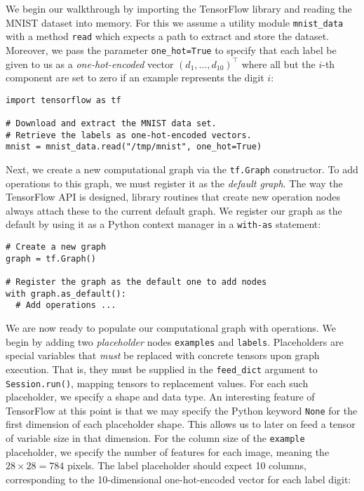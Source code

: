 We begin our walkthrough by importing the TensorFlow library and reading the
MNIST dataset into memory. For this we assume a utility module
\texttt{mnist\_data} with a method \texttt{read} which expects a path to extract
and store the dataset. Moreover, we pass the parameter \texttt{one\_hot=True} to
specify that each label be given to us as a \emph{one-hot-encoded} vector
$(d_1, \dots, d_{10})^\top$ where all but the $i$-th component are set to zero
if an example represents the digit $i$:

\begin{lstlisting}
import tensorflow as tf

# Download and extract the MNIST data set.
# Retrieve the labels as one-hot-encoded vectors.
mnist = mnist_data.read("/tmp/mnist", one_hot=True)
\end{lstlisting}

Next, we create a new computational graph via the \texttt{tf.Graph}
constructor. To add operations to this graph, we must register it as the
\emph{default graph}. The way the TensorFlow API is designed, library routines
that create new operation nodes always attach these to the current default
graph. We register our graph as the default by using it as a Python context
manager in a \texttt{with-as} statement:

\begin{lstlisting}
# Create a new graph
graph = tf.Graph()

# Register the graph as the default one to add nodes
with graph.as_default():
  # Add operations ...
\end{lstlisting}

We are now ready to populate our computational graph with operations. We begin
by adding two \emph{placeholder} nodes \texttt{examples} and
\texttt{labels}. Placeholders are special variables that \emph{must} be replaced
with concrete tensors upon graph execution. That is, they must be supplied in
the \texttt{feed\_dict} argument to \texttt{Session.run()}, mapping tensors to
replacement values. For each such placeholder, we specify a shape and
data type. An interesting feature of TensorFlow at this point is that we may
specify the Python keyword \texttt{None} for the first dimension of each
placeholder shape. This allows us to later on feed a tensor of variable size in
that dimension. For the column size of the \texttt{example} placeholder, we
specify the number of features for each image, meaning the $28 \times 28 = 784$
pixels. The label placeholder should expect 10 columns, corresponding to the
10-dimensional one-hot-encoded vector for each label digit:

